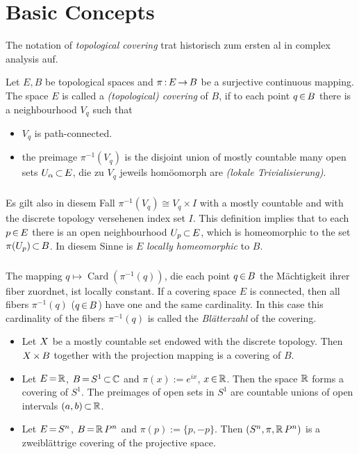 \documentclass[11pt,twoside]{article}
\begin{document}
\section{Basic Concepts}
The notation of \textit{topological covering} trat historisch zum ersten
al in complex analysis auf.

\begin{definition} %
Let $E,B$ be topological spaces
and $\pi {\,:\,} E {\,\to\,} B$ be a surjective continuous mapping.
The space $E$ is called a \textit{(topological) covering} of $B$,
if to each point $q {\,\in\,} B$ there is a neighbourhood $V_q$
such that

\begin{itemize}
\item
$V_q$ is path-connected.

\item
the preimage $\pi^{-1}(V_q)$ is the disjoint union of mostly
countable many open sets $U_{\alpha} {\,\subset\,} E$,
die zu $V_q$ jeweils hom\"oomorph are \textit{(lokale Trivialisierung)}.
\end{itemize}
\end{definition}

\subparagraph{}
Es gilt also in diesem Fall $\pi^{-1}(V_q) \cong V_q \times I$
with a mostly countable
and with the discrete topology versehenen index set $I$.
This definition implies
that to each $p {\,\in\,} E$ there is an open neighbourhood $U_p {\,\subset\,} E$,
which is homeomorphic to the set $\pi(U_p) {\,\subset\,} B$.
In diesem Sinne is $E$ \textit{locally homeomorphic} to $B$.

\subparagraph{}
The mapping $q \mapsto \operatorname{Card}(\pi^{-1}(q))$,
die each point $q {\,\in\,} B$ the M\"achtigkeit ihrer fiber zuordnet,
ist locally constant.
If a covering space $E$ is connected,
then all fibers $\pi^{-1}(q)$ ($q {\,\in\,} B$) have one and the same cardinality.
In this case this cardinality of the fibers $\pi^{-1}(q)$ is called
the \textit{Bl\"atterzahl} of the covering.

\begin{examples}
\begin{itemize}
\item
Let $X$ be a mostly countable set
endowed with the discrete topology.
Then $X {\,\times\,} B$ together with the projection mapping
is a covering of $B$.

\item
Let $E {\,=\,} {\mathbb{R}}$, $B {\,=\,} S^1 {\,\subset\,} {\mathbb{C}}$ and $\pi(x) := e^{ix}$, $x {\,\in\,} {\mathbb{R}}$.
Then the space ${\mathbb{R}}$ forms a covering of $S^1$.
The preimages of open sets in $S^1$ are countable unions
of open intervals $(a,b) {\,\subset\,} {\mathbb{R}}$.

\item
Let $E {\,=\,} S^n$, $B {\,=\,} {\mathbb{R}}\,P^n$ and $\pi(p) := \{p,-p\}$.
Then $(S^n,\pi,{\mathbb{R}}\,P^n)$ is a zweibl\"attrige covering
of the projective space.
\end{itemize}
\end{examples}
\end{document}
